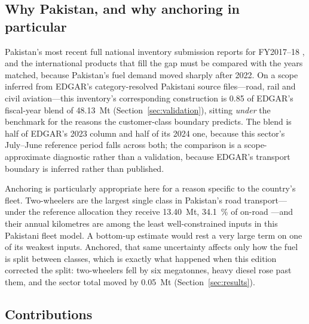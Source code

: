 \subsection{Why Pakistan, and why anchoring in particular}

Pakistan's most recent full national inventory submission reports for FY2017--18
\citep{pakbur1}, and the international products that fill the gap must be compared with the
years matched, because Pakistan's fuel demand moved sharply after 2022. On a scope
inferred from EDGAR's category-resolved Pakistani source files---road, rail and civil
aviation---this inventory's corresponding construction is \num{0.85} of EDGAR's
fiscal-year blend of \SI{48.13}{\mega\tonne} \citep{edgar2025booklet}
(Section~\ref{sec:validation}), sitting \emph{under} the benchmark for the reasons the
customer-class boundary predicts. The blend is half of EDGAR's 2023 column and half of
its 2024 one, because this sector's July--June reference period falls across both; the
comparison is a scope-approximate diagnostic rather than a validation, because EDGAR's
transport boundary is inferred rather than published.

Anchoring is particularly appropriate here for a reason specific to the country's fleet.
Two-wheelers are the largest single class in Pakistan's road transport---under the
reference allocation they receive \SI{13.40}{\mega\tonne}, \SI{34.1}{\percent} of
on-road \COtwo{}---and their annual kilometres are among the least well-constrained
inputs in this Pakistani fleet model. A bottom-up estimate would rest a very large term on
one of its weakest inputs. Anchored, that same uncertainty affects only how the fuel is
split between classes, which is exactly what happened when this edition corrected the
split: two-wheelers fell by six megatonnes, heavy diesel rose past them, and the sector
total moved by \SI{0.05}{\mega\tonne} (Section~\ref{sec:results}).

\subsection{Contributions}

